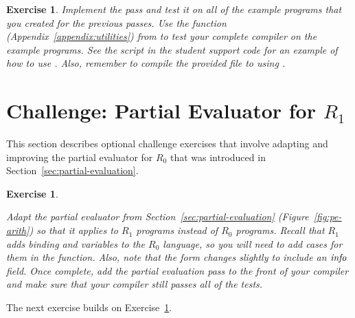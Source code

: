 \documentclass[11pt]{book}
\newtheorem{exercise}[theorem]{Exercise}
\begin{document}
\begin{exercise}
\normalfont Implement the  pass and test it on all of
the example programs that you created for the previous passes. Use the
 function (Appendix~\ref{appendix:utilities}) from
 to test your complete compiler on the example
programs.  See the  script in the student support
code for an example of how to use . Also, remember
to compile the provided  file to  using
.
\end{exercise}


\section{Challenge: Partial Evaluator for $R_1$}
\label{sec:pe-R1}

This section describes optional challenge exercises that involve
adapting and improving the partial evaluator for $R_0$ that was
introduced in Section~\ref{sec:partial-evaluation}.

\begin{exercise}\label{ex:pe-R1}
\normalfont
  
Adapt the partial evaluator from Section~\ref{sec:partial-evaluation}
(Figure~\ref{fig:pe-arith}) so that it applies to $R_1$ programs
instead of $R_0$ programs. Recall that $R_1$ adds  binding
and variables to the $R_0$ language, so you will need to add cases for
them in the  function. Also, note that the 
form changes slightly to include an $\mathit{info}$ field.  Once
complete, add the partial evaluation pass to the front of your
compiler and make sure that your compiler still passes all of the
tests.
\end{exercise}

The next exercise builds on Exercise~\ref{ex:pe-R1}.
\end{document}
